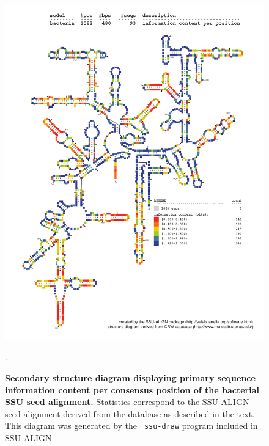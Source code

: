 \begin{figure}
\begin{center}
\includegraphics[width=5.64in]{Figures/bacteria-0p1-info}
\end{center}
\caption[Secondary structure diagram displaying primary sequence
  information content per consensus position of the bacterial SSU seed
  alignment]{\textbf{Secondary structure diagram displaying primary
  sequence information content per consensus position of the bacterial SSU seed
  alignment.} Statistics correspond to the SSU-ALIGN seed
  alignment derived from the  database \cite{CannoneGutell02}
  as described in the text. This diagram was generated by the {\tt
  ssu-draw} program included in SSU-ALIGN}.
\label{fig:bacinfo}
\end{figure}

\newpage 

